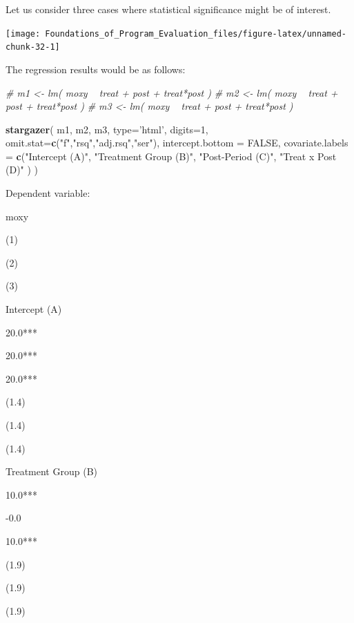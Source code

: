 \documentclass[]{book}
\newenvironment{Shaded}{\begin{snugshade}}{\end{snugshade}}
\newcommand{\CommentTok}[1]{\textcolor[rgb]{0.56,0.35,0.01}{\textit{#1}}}
\newcommand{\DataTypeTok}[1]{\textcolor[rgb]{0.13,0.29,0.53}{#1}}
\newcommand{\DecValTok}[1]{\textcolor[rgb]{0.00,0.00,0.81}{#1}}
\newcommand{\KeywordTok}[1]{\textcolor[rgb]{0.13,0.29,0.53}{\textbf{#1}}}
\newcommand{\NormalTok}[1]{#1}
\newcommand{\OtherTok}[1]{\textcolor[rgb]{0.56,0.35,0.01}{#1}}
\newcommand{\StringTok}[1]{\textcolor[rgb]{0.31,0.60,0.02}{#1}}
\theoremstyle{definition}
\theoremstyle{definition}
\theoremstyle{definition}
\theoremstyle{remark}
\begin{document}
Let us consider three cases where statistical significance might be of
interest.

\begin{center}\texttt{[image: Foundations\_of\_Program\_Evaluation\_files/figure-latex/unnamed-chunk-32-1]} \end{center}

The regression results would be as follows:

\begin{Shaded}
\begin{Highlighting}[]


\CommentTok{# m1 <- lm( moxy ~ treat + post + treat*post )}
\CommentTok{# m2 <- lm( moxy ~ treat + post + treat*post )}
\CommentTok{# m3 <- lm( moxy ~ treat + post + treat*post )}



\KeywordTok{stargazer}\NormalTok{( m1, m2, m3, }\DataTypeTok{type=}\StringTok{'html'}\NormalTok{, }\DataTypeTok{digits=}\DecValTok{1}\NormalTok{,}
           \DataTypeTok{omit.stat=}\KeywordTok{c}\NormalTok{(}\StringTok{"f"}\NormalTok{,}\StringTok{"rsq"}\NormalTok{,}\StringTok{"adj.rsq"}\NormalTok{,}\StringTok{"ser"}\NormalTok{),}
           \DataTypeTok{intercept.bottom =} \OtherTok{FALSE}\NormalTok{,}
           \DataTypeTok{covariate.labels =} \KeywordTok{c}\NormalTok{(}\StringTok{"Intercept (A)"}\NormalTok{, }\StringTok{"Treatment Group (B)"}\NormalTok{,}
                                \StringTok{"Post-Period (C)"}\NormalTok{, }\StringTok{"Treat x Post (D)"}\NormalTok{ ) )}
\end{Highlighting}
\end{Shaded}

Dependent variable:

moxy

(1)

(2)

(3)

Intercept (A)

20.0***

20.0***

20.0***

(1.4)

(1.4)

(1.4)

Treatment Group (B)

10.0***

-0.0

10.0***

(1.9)

(1.9)

(1.9)
\end{document}
